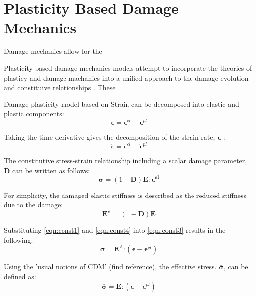 \section{Plasticity Based Damage Mechanics}

Damage mechanics allow for the 

Plasticity based damage mechanics models attempt to incorporate the
theories of plasticy and damage machanics into a unified approach
to the damage evolution and constituive relationships \cite{zhang_continuum_2010}. These 

Damage plasticity model based on Strain can be decomposed into elastic
and plastic components: 
\begin{equation}
\boldsymbol{\epsilon}=\boldsymbol{\epsilon}^{el}+\boldsymbol{\epsilon}^{pl}\label{eqn:const1}
\end{equation}


Taking the time derivative gives the decomposition of the strain rate,
$\boldsymbol{\dot{\epsilon}}$ : 
\begin{equation}
\boldsymbol{\dot{\epsilon}}=\boldsymbol{\dot{\epsilon}}^{el}+\boldsymbol{\dot{\epsilon}}^{pl}\label{eqn:const2}
\end{equation}


The constitutive stress-strain relationship including a scalar damage
parameter, $\mathbf{D}$ can be written as follows: 
\begin{equation}
\boldsymbol{\sigma}=(1-\mathbf{D})\mathbf{E}:\boldsymbol{\epsilon^{el}}\label{eqn:const3}
\end{equation}


For simplicity, the damaged elastic stiffness is described as the
reduced stiffness due to the damage: 
\begin{equation}
\mathbf{E^{d}}=(1-\mathbf{D})\mathbf{E}\label{eqn:const4}
\end{equation}


Substituting \ref{eqn:const1} and \ref{eqn:const4} into \ref{eqn:const3}
results in the following: 
\begin{equation}
\boldsymbol{\sigma}=\mathbf{E^{d}}:(\boldsymbol{\epsilon}-\boldsymbol{\epsilon}^{pl})\label{eqn:const5}
\end{equation}


Using the 'usual notions of CDM' (find
reference), the effective stress. $\boldsymbol{\bar{\sigma}}$, can
be defined as: 
\begin{equation}
\boldsymbol{\bar{\sigma}}=\mathbf{E}:(\boldsymbol{\epsilon}-\boldsymbol{\epsilon}^{pl})\label{eqn:const6}
\end{equation}


